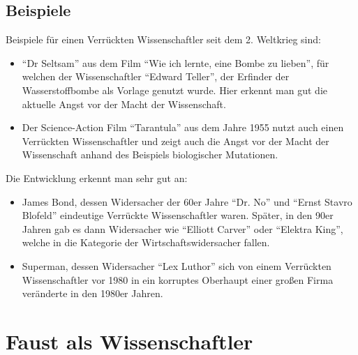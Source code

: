 \documentclass[12pt]{scrreprt}
\begin{document}
\section{Beispiele}
	\label{sec:beispiele}
Beispiele für einen Verrückten Wissenschaftler seit dem 2. Weltkrieg sind:
\begin{itemize}
	\item \enquote{Dr Seltsam} aus dem Film \enquote{Wie ich lernte, eine Bombe zu lieben}, für welchen der Wissenschaftler \enquote{Edward Teller}, der Erfinder der Wasserstoffbombe als Vorlage genutzt wurde. Hier erkennt man gut die aktuelle Angst vor der Macht der Wissenschaft.
	\item Der Science-Action Film \enquote{Tarantula} aus dem Jahre 1955 nutzt auch einen Verrückten Wissenschaftler und zeigt auch die Angst vor der Macht der Wissenschaft anhand des Beispiels biologischer Mutationen.
\end{itemize}
Die Entwicklung erkennt man sehr gut an:
\begin{itemize}
	\item James Bond, dessen Widersacher der 60er Jahre \enquote{Dr. No} und \enquote{Ernst Stavro Blofeld} eindeutige Verrückte Wissenschaftler waren. Später, in den 90er Jahren gab es dann Widersacher wie \enquote{Elliott Carver} oder \enquote{Elektra King}, welche in die Kategorie der Wirtschaftswidersacher fallen.
	\item Superman, dessen Widersacher \enquote{Lex Luthor} sich von einem Verrückten Wissenschaftler vor 1980 in ein korruptes Oberhaupt einer großen Firma veränderte in den 1980er Jahren.
\end{itemize}
\autocite{wiki:Verrückter_Wissenschaftler}

\chapter{Faust als Wissenschaftler}
	\label{chap:faust als wissenschaftler}
\end{document}
